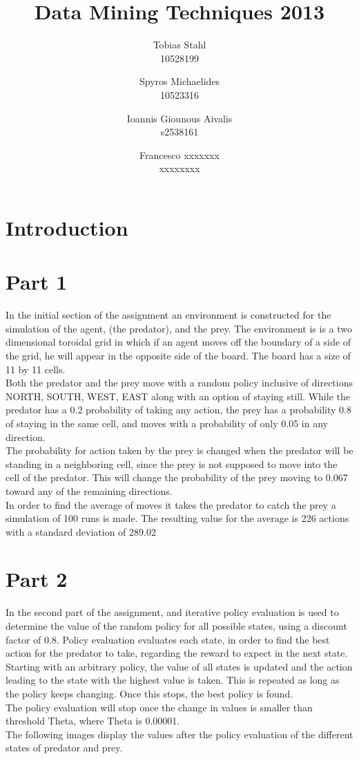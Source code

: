 \documentclass[11pt]{article}
\title{
	\textbf{Data Mining Techniques 2013}
}
\author{Tobias Stahl \\ 10528199 \and Spyros Michaelides \\ 10523316 \and Ioannis Giounous Aivalis \\ s2538161 \and Francesco xxxxxxx \\ xxxxxxxx}
\date{}
\begin{document}
\maketitle

\section{Introduction}



\section{Part 1}

In the initial section of the assignment an environment is constructed for the simulation of the agent, (the predator), and the prey. The environment is is a two dimensional toroidal grid in which if an agent moves off the boundary of a side of the grid, he will appear in the opposite side of the board. The board has a size of 11 by 11 cells.\\
Both the predator and the prey move with a random policy inclusive of directions NORTH, SOUTH, WEST, EAST along with an option of staying still. While the predator has a 0.2 probability of taking any action, the prey has a probability 0.8 of staying in the same cell, and moves with a probability of only 0.05 in any direction.\\
The probability for action taken by the prey is changed when the predator will be standing in a neighboring cell, since the prey is not supposed to move into the cell of the predator. This will change the probability of the prey moving to 0.067 toward any of the remaining directions.\\
In order to find the average of moves it takes the predator to catch the prey a simulation of 100 runs is made. The resulting value for the average is 226 actions with a standard deviation of 289.02



\section{Part 2}

In the second part of the assignment, and iterative policy evaluation is used to determine the value of the random policy for all possible states, using a discount factor of 0.8.
Policy evaluation evaluates each state, in order to find the best action for the predator to take, regarding the reward to expect in the next state.\\
Starting with an arbitrary policy, the value of all states is updated and the action leading to the state with the highest value is taken. This is repeated as long as the policy keeps changing. Once this stops, the best policy is found.\\
The policy evaluation will stop once the change in values is smaller than threshold Theta, where Theta is 0.00001.\\
The following images display the values after the policy evaluation of the different states of predator and prey.
\end{document}
